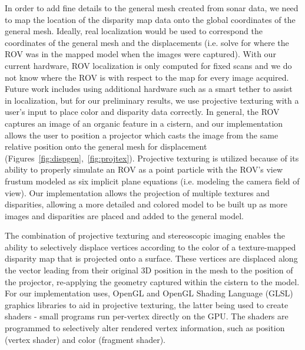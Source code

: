 \documentclass[a4paper,twoside]{article}
\begin{document}
\noindent In order to add fine details to the general mesh created from sonar data, we need to map the location of the disparity map data onto the global coordinates of the general mesh.  Ideally, real localization would be used to correspond the coordinates of the general mesh and the displacements (i.e. solve for where the ROV was in the mapped model when the images were captured).  With our current hardware, ROV localization is only computed for fixed scans and we do not know where the ROV is with respect to the map for every image acquired.  Future work includes using additional hardware such as a smart tether to assist in localization, but for our preliminary results, we use projective texturing with a user's input to place color and disparity data correctly. In general, the ROV captures an image of an organic feature in a cistern, and our implementation allows the user to position a projector which casts the image from the same relative position onto the general mesh for displacement (Figures~\ref{fig:dispgen},~\ref{fig:projtex}). Projective texturing is  utilized because of its ability to properly simulate an ROV as a point particle with the ROV's view frustum modeled as six implicit plane equations (i.e. modeling the camera field of view). Our implementation allows the projection of multiple textures and disparities, allowing a more detailed and colored model to be built up as more images and disparities are placed and added to the general model.  

The combination of projective texturing and stereoscopic imaging enables the ability to selectively displace vertices according to the color of a texture-mapped disparity map that is projected onto a surface. These vertices are displaced along the vector leading from their original 3D position in the mesh to the position of the projector, re-applying the geometry captured within the cistern to the model.  For our implementation uses, OpenGL and OpenGL Shading Language (GLSL) graphics libraries to aid in projective texturing, the latter being used to create shaders - small programs run per-vertex directly on the GPU. The shaders are programmed to selectively alter rendered vertex information, such as position (vertex shader) and color (fragment shader). 
\end{document}
